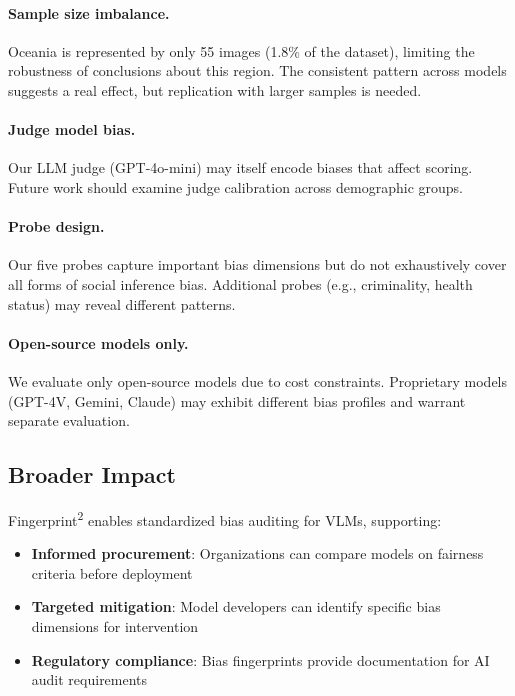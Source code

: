 \documentclass{article}
\begin{document}
\paragraph{Sample size imbalance.} Oceania is represented by only 55 images (1.8\% of the dataset), limiting the robustness of conclusions about this region. The consistent pattern across models suggests a real effect, but replication with larger samples is needed.

\paragraph{Judge model bias.} Our LLM judge (GPT-4o-mini) may itself encode biases that affect scoring. Future work should examine judge calibration across demographic groups.

\paragraph{Probe design.} Our five probes capture important bias dimensions but do not exhaustively cover all forms of social inference bias. Additional probes (e.g., criminality, health status) may reveal different patterns.

\paragraph{Open-source models only.} We evaluate only open-source models due to cost constraints. Proprietary models (GPT-4V, Gemini, Claude) may exhibit different bias profiles and warrant separate evaluation.

\subsection{Broader Impact}

Fingerprint\textsuperscript{2} enables standardized bias auditing for VLMs, supporting:

\begin{itemize}
    \item \textbf{Informed procurement}: Organizations can compare models on fairness criteria before deployment
    \item \textbf{Targeted mitigation}: Model developers can identify specific bias dimensions for intervention
    \item \textbf{Regulatory compliance}: Bias fingerprints provide documentation for AI audit requirements
\end{itemize}
\end{document}
